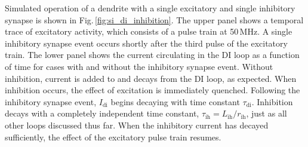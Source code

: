 \documentclass[twocolumn]{article}
\begin{document}
\begin{figure}[t!] 
\end{figure}
Simulated operation of a dendrite with a single excitatory and single inhibitory synapse is shown in Fig.\,\ref{fig:si_di_inhibition}. The upper panel shows a temporal trace of excitatory activity, which consists of a pulse train at 50\,MHz. A single inhibitory synapse event occurs shortly after the third pulse of the excitatory train. The lower panel shows the current circulating in the DI loop as a function of time for cases with and without the inhibitory synapse event. Without inhibition, current is added to and decays from the DI loop, as expected. When inhibition occurs, the effect of excitation is immediately quenched. Following the inhibitory synapse event, $I_{\mathrm{di}}$ begins decaying with time constant $\tau_{\mathrm{di}}$. Inhibition decays with a completely independent time constant, $\tau_{\mathrm{ih}} = L_{\mathrm{ih}}/r_{\mathrm{ih}}$, just as all other loops discussed thus far. When the inhibitory current has decayed sufficiently, the effect of the excitatory pulse train resumes. 
\end{document}
